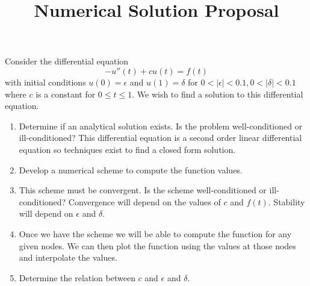 \documentclass[12pt]{article}
\title{Numerical Solution Proposal}
\begin{document}
\maketitle

Consider the differential equation
\[
  - u''(t) + c u(t) = f(t)
\]
with initial conditions $u(0) = \epsilon$  and $u(1) = \delta$ for $0<|\epsilon|<0.1, 0<|\delta|<0.1$
where $c$ is a constant for $0\leq t \leq 1$.
We wish to find a solution to this differential equation.

\begin{enumerate}
  \item Determine if an analytical solution exists. Is the problem well-conditioned
    or ill-conditioned? This differential equation is
    a second order linear differential equation so techniques exist to find
    a closed form solution.
  \item Develop a numerical scheme to compute the function values.
  \item This scheme must be convergent. Is the scheme well-conditioned or ill-conditioned?
    Convergence will depend on the values of $c$ and $f(t)$. Stability will depend on $\epsilon$ and $\delta$.
  \item Once we have the scheme we will be able to compute the function for
    any given nodes. We can then plot the function using the values at those nodes
    and interpolate the values.
  \item Determine the relation between $c$ and $\epsilon$ and $\delta$.
\end{enumerate}
\end{document}
